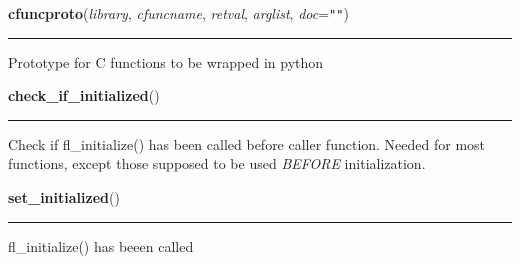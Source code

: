     \label{xformslib:library:cfuncproto}

    \vspace{0.5ex}

\hspace{.8\funcindent}\begin{boxedminipage}{\funcwidth}

    \raggedright \textbf{cfuncproto}(\textit{library}, \textit{cfuncname}, \textit{retval}, \textit{arglist}, \textit{doc}={\tt ""})

    \vspace{-1.5ex}

    \rule{\textwidth}{0.5\fboxrule}
\setlength{\parskip}{2ex}

Prototype for C functions to be wrapped in python
\setlength{\parskip}{1ex}
    \end{boxedminipage}

    \label{xformslib:library:check_if_initialized}

    \vspace{0.5ex}

\hspace{.8\funcindent}\begin{boxedminipage}{\funcwidth}

    \raggedright \textbf{check\_if\_initialized}()

    \vspace{-1.5ex}

    \rule{\textwidth}{0.5\fboxrule}
\setlength{\parskip}{2ex}

Check if fl\_initialize() has been called before caller function.
Needed for most functions, except those supposed to be used
\emph{BEFORE} initialization.
\setlength{\parskip}{1ex}
    \end{boxedminipage}

    \label{xformslib:library:set_initialized}

    \vspace{0.5ex}

\hspace{.8\funcindent}\begin{boxedminipage}{\funcwidth}

    \raggedright \textbf{set\_initialized}()

    \vspace{-1.5ex}

    \rule{\textwidth}{0.5\fboxrule}
\setlength{\parskip}{2ex}

fl\_initialize() has beeen called
\setlength{\parskip}{1ex}
    \end{boxedminipage}

